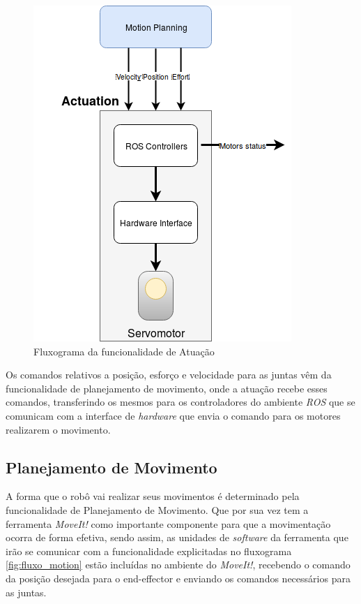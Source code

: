 \begin{figure}[H]
	\centering
	\includegraphics[scale=0.5]{Figures/actuation_depen.png}
	\caption{Fluxograma da funcionalidade de Atuação}
	\label{fig:flux_atu}
\end{figure}

Os comandos relativos a posição, esforço e velocidade para as juntas vêm da funcionalidade de planejamento de movimento, onde a atuação recebe esses comandos, transferindo os mesmos para os controladores do ambiente \textit{ROS} que se comunicam com a interface de \textit{hardware} que envia o comando para os motores realizarem o movimento.
\subsection{Planejamento de Movimento}\label{sec:plan_mov}
A forma que o robô vai realizar seus movimentos é determinado pela funcionalidade de Planejamento de Movimento. Que por sua vez tem a ferramenta \textit{MoveIt!} como importante componente para que a movimentação ocorra de forma efetiva, sendo assim, as unidades de \textit{software} da ferramenta que irão se comunicar com a funcionalidade explicitadas no fluxograma \ref{fig:fluxo_motion} estão incluídas no ambiente do \textit{MoveIt!}, recebendo o comando da posição desejada para o end-effector e enviando os comandos necessários para as juntas. 
	
